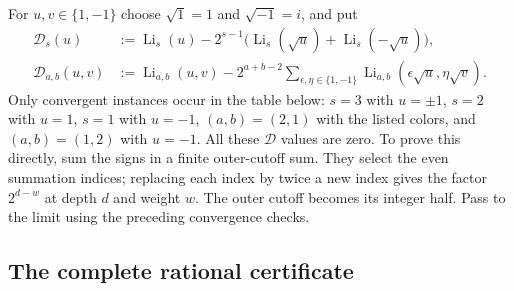 \documentclass[11pt,a4paper]{article}
\numberwithin{equation}{section}
\theoremstyle{definition}
\theoremstyle{remark}
\DeclareMathOperator{\Li}{Li}
\begin{document}
For $u,v\in\{1,-1\}$ choose $\sqrt1=1$ and $\sqrt{-1}=i$, and put
\begin{align}
 \mathcal D_s(u)
 &:=\Li_s(u)-2^{s-1}
       \bigl(\Li_s(\sqrt u)+\Li_s(-\sqrt u)\bigr),
       \label{par:eq:Dsingle}\\
 \mathcal D_{a,b}(u,v)
 &:=\Li_{a,b}(u,v)-2^{a+b-2}
       \sum_{\epsilon,\eta\in\{1,-1\}}
          \Li_{a,b}(\epsilon\sqrt u,\eta\sqrt v).
       \label{par:eq:Ddouble}
\end{align}
Only convergent instances occur in the table below: $s=3$ with $u=\pm1$,
$s=2$ with $u=1$, $s=1$ with $u=-1$, $(a,b)=(2,1)$ with the listed
colors, and $(a,b)=(1,2)$ with $u=-1$.
All these $\mathcal D$ values are zero. To prove this directly, sum the
signs in a finite outer-cutoff sum. They select the even summation indices;
replacing each index by twice a new index gives the factor $2^{d-w}$
at depth $d$ and weight $w$. The outer cutoff becomes its integer half.
Pass to the limit using the preceding convergence checks.

\subsection{The complete rational certificate}
\end{document}
